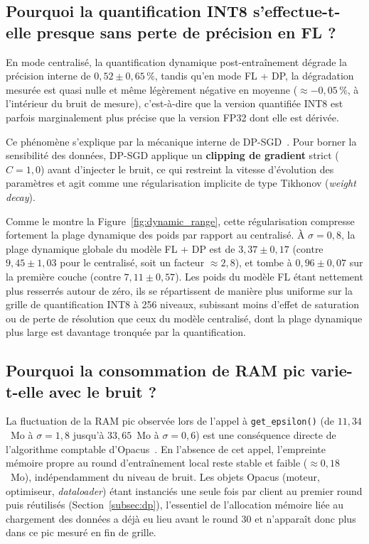 \documentclass{article}
\begin{document}
\subsection{Pourquoi la quantification INT8 s'effectue-t-elle presque sans perte de
précision en FL ?}

En mode centralisé, la quantification dynamique post-entraînement dégrade la précision
interne de $0{,}52 \pm 0{,}65\,\%$, tandis qu'en mode FL + DP, la dégradation mesurée
est quasi nulle et même légèrement négative en moyenne ($\approx -0{,}05\,\%$, à
l'intérieur du bruit de mesure), c'est-à-dire que la version quantifiée INT8 est
parfois marginalement plus précise que la version FP32 dont elle est dérivée.

Ce phénomène s'explique par la mécanique interne de DP-SGD~\cite{abadi2016deep}. Pour
borner la sensibilité des données, DP-SGD applique un \textbf{clipping de gradient}
strict ($C=1{,}0$) avant d'injecter le bruit, ce qui restreint la vitesse d'évolution
des paramètres et agit comme une régularisation implicite de type Tikhonov
(\textit{weight decay}).

Comme le montre la Figure~\ref{fig:dynamic_range}, cette régularisation compresse
fortement la plage dynamique des poids par rapport au centralisé. À $\sigma = 0{,}8$,
la plage dynamique globale du modèle FL + DP est de $3{,}37 \pm 0{,}17$ (contre
$9{,}45 \pm 1{,}03$ pour le centralisé, soit un facteur $\approx 2{,}8$), et tombe à
$0{,}96 \pm 0{,}07$ sur la première couche (contre $7{,}11 \pm 0{,}57$). Les poids du
modèle FL étant nettement plus resserrés autour de zéro, ils se répartissent de
manière plus uniforme sur la grille de quantification INT8 à 256 niveaux, subissant
moins d'effet de saturation ou de perte de résolution que ceux du modèle centralisé,
dont la plage dynamique plus large est davantage tronquée par la quantification.

\subsection{Pourquoi la consommation de RAM pic varie-t-elle avec le bruit ?}

La fluctuation de la RAM pic observée lors de l'appel à \texttt{get\_epsilon()}
(de $11{,}34$~Mo à $\sigma=1{,}8$ jusqu'à $33{,}65$~Mo à $\sigma=0{,}6$) est une
conséquence directe de l'algorithme comptable d'Opacus~\cite{opacus}. En l'absence
de cet appel, l'empreinte mémoire propre au round d'entraînement local reste stable et
faible ($\approx 0{,}18$~Mo), indépendamment du niveau de bruit. Les objets Opacus
(moteur, optimiseur, \textit{dataloader}) étant instanciés une seule fois par client
au premier round puis réutilisés (Section~\ref{subsec:dp}), l'essentiel de
l'allocation mémoire liée au chargement des données a déjà eu lieu avant le round 30
et n'apparaît donc plus dans ce pic mesuré en fin de grille.
\end{document}
